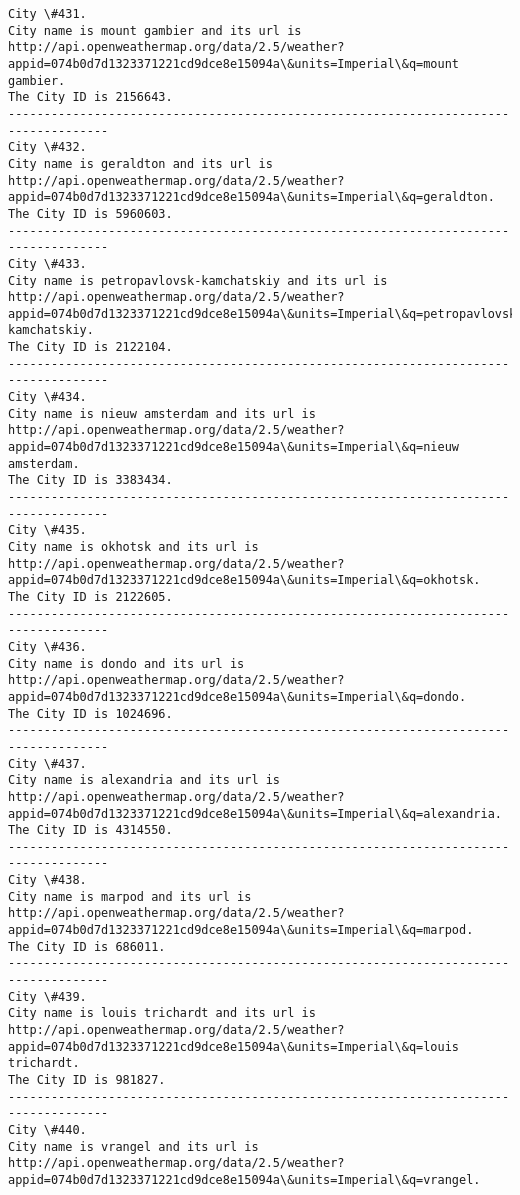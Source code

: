 \documentclass[11pt]{article}
\begin{document}
\begin{Verbatim}[commandchars=\\\{\}]
City \#431.
City name is mount gambier and its url is http://api.openweathermap.org/data/2.5/weather?appid=074b0d7d1323371221cd9dce8e15094a\&units=Imperial\&q=mount gambier.
The City ID is 2156643.
------------------------------------------------------------------------------------
City \#432.
City name is geraldton and its url is http://api.openweathermap.org/data/2.5/weather?appid=074b0d7d1323371221cd9dce8e15094a\&units=Imperial\&q=geraldton.
The City ID is 5960603.
------------------------------------------------------------------------------------
City \#433.
City name is petropavlovsk-kamchatskiy and its url is http://api.openweathermap.org/data/2.5/weather?appid=074b0d7d1323371221cd9dce8e15094a\&units=Imperial\&q=petropavlovsk-kamchatskiy.
The City ID is 2122104.
------------------------------------------------------------------------------------
City \#434.
City name is nieuw amsterdam and its url is http://api.openweathermap.org/data/2.5/weather?appid=074b0d7d1323371221cd9dce8e15094a\&units=Imperial\&q=nieuw amsterdam.
The City ID is 3383434.
------------------------------------------------------------------------------------
City \#435.
City name is okhotsk and its url is http://api.openweathermap.org/data/2.5/weather?appid=074b0d7d1323371221cd9dce8e15094a\&units=Imperial\&q=okhotsk.
The City ID is 2122605.
------------------------------------------------------------------------------------
City \#436.
City name is dondo and its url is http://api.openweathermap.org/data/2.5/weather?appid=074b0d7d1323371221cd9dce8e15094a\&units=Imperial\&q=dondo.
The City ID is 1024696.
------------------------------------------------------------------------------------
City \#437.
City name is alexandria and its url is http://api.openweathermap.org/data/2.5/weather?appid=074b0d7d1323371221cd9dce8e15094a\&units=Imperial\&q=alexandria.
The City ID is 4314550.
------------------------------------------------------------------------------------
City \#438.
City name is marpod and its url is http://api.openweathermap.org/data/2.5/weather?appid=074b0d7d1323371221cd9dce8e15094a\&units=Imperial\&q=marpod.
The City ID is 686011.
------------------------------------------------------------------------------------
City \#439.
City name is louis trichardt and its url is http://api.openweathermap.org/data/2.5/weather?appid=074b0d7d1323371221cd9dce8e15094a\&units=Imperial\&q=louis trichardt.
The City ID is 981827.
------------------------------------------------------------------------------------
City \#440.
City name is vrangel and its url is http://api.openweathermap.org/data/2.5/weather?appid=074b0d7d1323371221cd9dce8e15094a\&units=Imperial\&q=vrangel.

\end{Verbatim}
\end{document}
